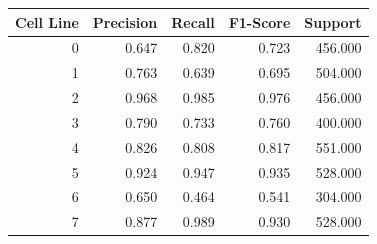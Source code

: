 \begin{tabular}{rrrrr}
\toprule
Cell Line & Precision & Recall & F1-Score & Support \\
\midrule
0 & 0.647 & 0.820 & 0.723 & 456.000 \\
1 & 0.763 & 0.639 & 0.695 & 504.000 \\
2 & 0.968 & 0.985 & 0.976 & 456.000 \\
3 & 0.790 & 0.733 & 0.760 & 400.000 \\
4 & 0.826 & 0.808 & 0.817 & 551.000 \\
5 & 0.924 & 0.947 & 0.935 & 528.000 \\
6 & 0.650 & 0.464 & 0.541 & 304.000 \\
7 & 0.877 & 0.989 & 0.930 & 528.000 \\
\bottomrule
\end{tabular}

